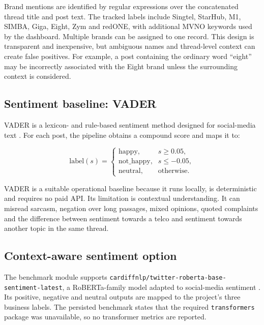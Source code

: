 \documentclass[11pt,a4paper]{article}
\begin{document}
Brand mentions are identified by regular expressions over the concatenated thread title and post text. The tracked labels include Singtel, StarHub, M1, SIMBA, Giga, Eight, Zym and redONE, with additional MVNO keywords used by the dashboard. Multiple brands can be assigned to one record. This design is transparent and inexpensive, but ambiguous names and thread-level context can create false positives. For example, a post containing the ordinary word ``eight'' may be incorrectly associated with the Eight brand unless the surrounding context is considered.

\subsection{Sentiment baseline: VADER}

VADER is a lexicon- and rule-based sentiment method designed for social-media text \cite{hutto2014vader}. For each post, the pipeline obtains a compound score and maps it to:

\begin{equation}
\text{label}(s)=
\begin{cases}
\text{happy}, & s \geq 0.05,\\
\text{not\_happy}, & s \leq -0.05,\\
\text{neutral}, & \text{otherwise}.
\end{cases}
\end{equation}

VADER is a suitable operational baseline because it runs locally, is deterministic and requires no paid API. Its limitation is contextual understanding. It can misread sarcasm, negation over long passages, mixed opinions, quoted complaints and the difference between sentiment towards a telco and sentiment towards another topic in the same thread.

\subsection{Context-aware sentiment option}

The benchmark module supports \texttt{cardiffnlp/twitter-roberta-base-sentiment-latest}, a RoBERTa-family model adapted to social-media sentiment \cite{loureiro2022tweeteval}. Its positive, negative and neutral outputs are mapped to the project's three business labels. The persisted benchmark states that the required \texttt{transformers} package was unavailable, so no transformer metrics are reported.
\end{document}

